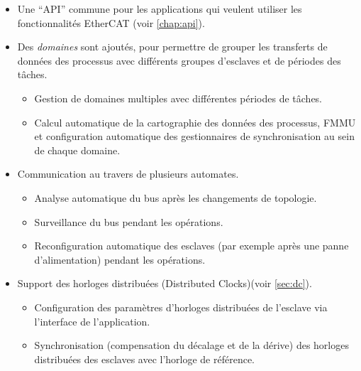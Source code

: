 \documentclass[a4paper,12pt,BCOR=6mm,bibtotoc,idxtotoc]{scrbook}
\begin{document}
\begin{itemize}
\item Une ``API'' commune pour les applications qui veulent utiliser
  les fonctionnalit\'es EtherCAT (voir \autoref{chap:api}).

\item Des \textit{domaines} sont ajout\'es, pour permettre de grouper
  les transferts de donn\'ees des processus avec diff\'erents groupes
  d'esclaves et de p\'eriodes des t\^aches.


  \begin{itemize}

  \item Gestion de domaines multiples avec diff\'erentes p\'eriodes de
    t\^aches.

  \item Calcul automatique de la cartographie des donn\'ees des
    processus, FMMU et configuration automatique des gestionnaires de
    synchronisation au sein de chaque domaine.

  \end{itemize}

\item Communication au travers de plusieurs automates.

  \begin{itemize}

  \item Analyse automatique du bus apr\`es les changements de topologie.

  \item Surveillance du bus pendant les op\'erations.

  \item Reconfiguration automatique des esclaves (par exemple apr\`es
    une panne d'alimentation) pendant les op\'erations.

  \end{itemize}

\item Support des horloges distribu\'ees (Distributed Clocks)(voir
  \autoref{sec:dc}).

  \begin{itemize}

  \item Configuration des param\`etres d'horloges distribu\'ees de
    l'esclave via l'interface de l'application.

  \item Synchronisation (compensation du d\'ecalage et de la d\'erive)
    des horloges distribu\'ees des esclaves avec l'horloge de
    r\'ef\'erence.


\end{itemize}
\end{itemize}
\end{document}
